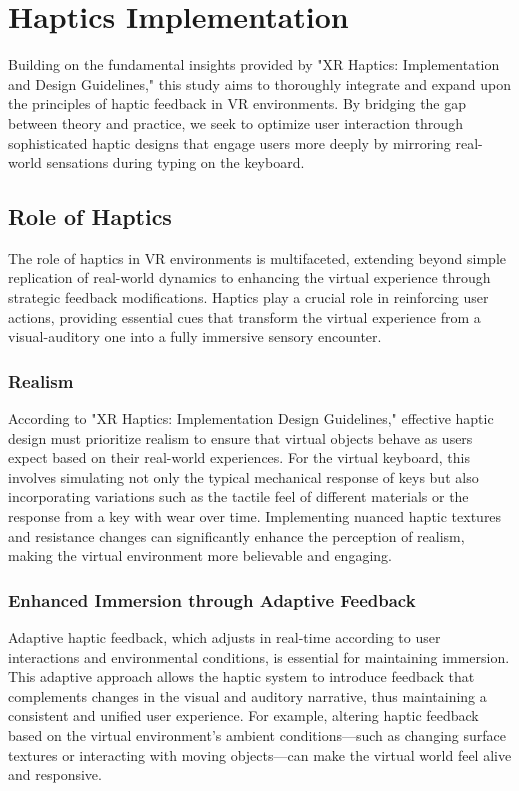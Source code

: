 \chapter{Haptics Implementation}
\label{sec:Haptics Implementation}

Building on the fundamental insights provided by "XR Haptics: Implementation and Design Guidelines," this study aims to thoroughly integrate and expand upon the principles of haptic feedback in \ac{VR} environments. By bridging the gap between theory and practice, we seek to optimize user interaction through sophisticated haptic designs that engage users more deeply by mirroring real-world sensations during typing on the keyboard.

\section{Role of Haptics}
\label{sec:RoleOfHaptics}
The role of haptics in \ac{VR} environments is multifaceted, extending beyond simple replication of real-world dynamics to enhancing the virtual experience through strategic feedback modifications. Haptics play a crucial role in reinforcing user actions, providing essential cues that transform the virtual experience from a visual-auditory one into a fully immersive sensory encounter.

\subsection{Realism}
\label{subsec:Realism}
According to "XR Haptics: Implementation Design Guidelines," effective haptic design must prioritize realism to ensure that virtual objects behave as users expect based on their real-world experiences. For the virtual keyboard, this involves simulating not only the typical mechanical response of keys but also incorporating variations such as the tactile feel of different materials or the response from a key with wear over time. Implementing nuanced haptic textures and resistance changes can significantly enhance the perception of realism, making the virtual environment more believable and engaging.

\subsection{Enhanced Immersion through Adaptive Feedback}
\label{subsec:Immersion}
Adaptive haptic feedback, which adjusts in real-time according to user interactions and environmental conditions, is essential for maintaining immersion. This adaptive approach allows the haptic system to introduce feedback that complements changes in the visual and auditory narrative, thus maintaining a consistent and unified user experience. For example, altering haptic feedback based on the virtual environment's ambient conditions—such as changing surface textures or interacting with moving objects—can make the virtual world feel alive and responsive.

